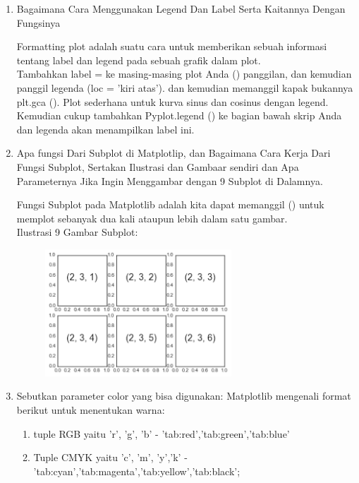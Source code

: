 \begin{enumerate}
\item Bagaimana Cara Menggunakan Legend Dan Label Serta Kaitannya Dengan Fungsinya

Formatting plot adalah suatu cara untuk memberikan sebuah informasi tentang label dan legend pada sebuah grafik dalam plot.\\
Tambahkan label = ke masing-masing plot Anda () panggilan, dan kemudian panggil legenda (loc = 'kiri atas'). 
dan kemudian memanggil kapak bukannya plt.gca (). Plot sederhana untuk kurva sinus dan cosinus dengan legend. 
Kemudian cukup tambahkan Pyplot.legend () ke bagian bawah skrip Anda dan legenda akan menampilkan label ini.



\item Apa fungsi Dari Subplot di Matplotlip, dan Bagaimana Cara Kerja Dari Fungsi Subplot, Sertakan Ilustrasi dan Gambaar sendiri dan 
Apa Parameternya Jika Ingin Menggambar dengan 9 Subplot di Dalamnya.

Fungsi Subplot pada Matplotlib adalah kita dapat memanggil () untuk memplot sebanyak dua kali ataupun lebih dalam satu gambar.\\


Ilustrasi 9 Gambar Subplot:
	\begin{figure}[ht!]
	\includegraphics[width=7cm]{figures/6/1174062/subplot.png}
	\centering
	\end{figure}

\item Sebutkan parameter color yang bisa digunakan:
Matplotlib mengenali format berikut untuk menentukan warna:\\
\begin{enumerate}
\item tuple RGB yaitu {'r', 'g', 'b'}
	- {'tab:red','tab:green','tab:blue'}
\item Tuple CMYK yaitu {'c', 'm', 'y','k'}
	- {'tab:cyan','tab:magenta','tab:yellow','tab:black'}; 
\end{enumerate}


\end{enumerate}
